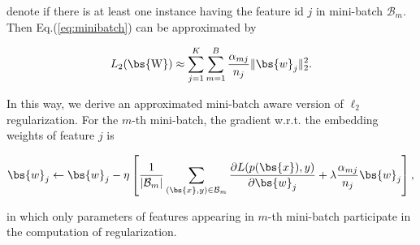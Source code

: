 denote if there is at least one instance having the feature id $j$ in mini-batch $\mathcal{B}_m$.
Then Eq.(\ref{eq:minibatch}) can be approximated by
\begin{small}
\begin{equation}
\label{eq:approx}
L_2(\bs{\mathrm{W}})\approx\sum_{j=1}^{K} \sum_{m=1}^{B}  \frac{\alpha_{mj}}{n_j}\|\bs{w}_j\|_2^2.
\end{equation}
\end{small}
In this way, we derive an approximated mini-batch aware version of $\ell_2$ regularization.
For the $m$-th mini-batch, the gradient w.r.t. the embedding weights of feature $j$ is
\begin{small}
\begin{equation}
\bs{w}_j \leftarrow \bs{w}_j- \eta
    \left[
       \frac{1}{|\mathcal{B}_m|} \sum_{(\bs{x},y) \in \mathcal{B}_m} { \frac{\partial L(p(\bs{x}), y)}{\partial \bs{w}_j}
       +\lambda \frac{\alpha_{mj}}{n_j}\bs{w}_j}
    \right],
\end{equation}
\end{small}
in which only parameters of features appearing in $m$-th mini-batch participate in the computation of regularization. 






